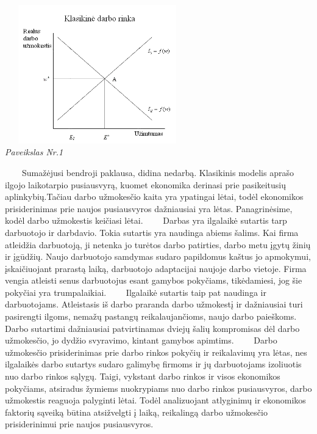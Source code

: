 \documentclass[12pt,a4paper]{article}
\theoremstyle{change}\newtheorem{salyga}{Uždavinys}
\begin{document}
\begin{center}
\includegraphics[width=80mm,height=60mm]{darborinka.PNG}
\\
\textit{Paveikslas Nr.1}
\end{center}

\vskip 8pt
$\qquad $Sumažėjusi bendroji paklausa, didina nedarbą. Klasikinis modelis aprašo ilgojo laikotarpio pusiausvyrą, kuomet ekonomika derinasi prie pasikeitusių aplinkybių.Tačiau darbo užmokesčio kaita yra ypatingai lėtai, todėl ekonomikos prisiderinimas prie naujos pusiausvyros dažniausiai yra lėtas. Panagrinėsime, kodėl darbo užmokestis keičiasi lėtai.
\vskip 8pt
$\qquad $Darbas yra ilgalaikė sutartis tarp darbuotojo ir darbdavio. Tokia sutartis yra naudinga abiems šalims. Kai firma atleidžia darbuotoją, ji netenka jo turėtos darbo patirties, darbo metu įgytų žinių ir įgūdžių. Naujo darbuotojo samdymas sudaro papildomus kaštus jo apmokymui, įskaičiuojant prarastą laiką, darbuotojo adaptacijai naujoje darbo vietoje. Firma vengia atleisti senus darbuotojus esant gamybos pokyčiams, tikėdamiesi, jog šie pokyčiai yra trumpalaikiai. 
\vskip 8pt
$\qquad $Ilgalaikė sutartis taip pat naudinga ir darbuotojams. Atleistasis iš darbo praranda darbo užmokestį ir dažniausiai turi pasirengti ilgoms, nemažų pastangų reikalaujančioms, naujo darbo paieškoms. Darbo sutartimi dažniausiai patvirtinamas dviejų šalių kompromisas dėl darbo užmokesčio, jo dydžio svyravimo, kintant gamybos apimtims.
\vskip 8pt
$\qquad $Darbo užmokesčio prisiderinimas prie darbo rinkos pokyčių ir reikalavimų yra lėtas, nes ilgalaikės darbo sutartys sudaro galimybę firmoms ir jų darbuotojams izoliuotis nuo darbo rinkos sąlygų. Taigi, vykstant darbo rinkos ir visos ekonomikos pokyčiams, atsiradus žymiems nuokrypiams nuo darbo rinkos pusiausvyros, darbo užmokestis reaguoja palyginti lėtai. Todėl analizuojant atlyginimų ir ekonomikos faktorių sąveiką būtina atsižvelgti į laiką, reikalingą darbo užmokesčio prisiderinimui prie naujos pusiausvyros.
\vskip 8pt
\end{document}
